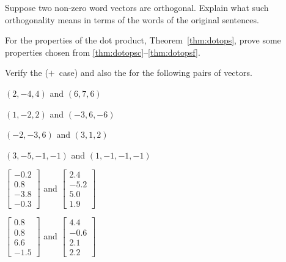 \begin{exercise} \label{ex:} 
Suppose two non-zero word vectors are orthogonal.  
Explain what such orthogonality means in terms of the words of the original sentences.
\end{exercise}






\begin{exercise} \label{ex:dotops} 
For the properties of the dot product, Theorem~\ref{thm:dotops}, prove some properties chosen from \ref{thm:dotopsc}--\ref{thm:dotopsf}.
\end{exercise}



\begin{exercise} \label{ex:} 
Verify the  (\(+\)~case) and also the  for the following pairs of vectors.
\begin{parts}
\item \((2,-4,4)\) and \((6,7,6)\)
\item \((1,-2,2)\) and \((-3,6,-6)\)
\item \((-2,-3,6)\) and \((3,1,2)\)
\item \((3,-5,-1,-1)\) and \((1,-1,-1,-1)\)
\item \(\begin{bmatrix} -0.2\\0.8\\-3.8\\-0.3 \end{bmatrix}\) and 
\(\begin{bmatrix} 2.4\\-5.2\\5.0\\1.9 \end{bmatrix}\)
\item \(\begin{bmatrix} 0.8\\0.8\\6.6\\-1.5 \end{bmatrix}\) and 
\(\begin{bmatrix} 4.4\\-0.6\\2.1\\2.2 \end{bmatrix}\)
\end{parts}
\end{exercise}



